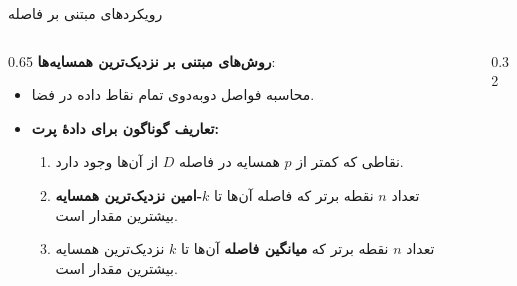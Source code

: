 \begin{frame}{رویکردهای مبتنی بر فاصله}{}
  \begin{columns}[T]
    \begin{column}{0.65\textwidth}
      \textbf{روش‌های مبتنی بر نزدیک‌ترین همسایه‌ها}: 
      \begin{itemize}
        \setlength{\itemsep}{4pt}
        \item محاسبه فواصل دوبه‌دوی تمام نقاط داده در فضا.
        \item \textbf{تعاریف گوناگون برای دادۀ پرت:}
        \begin{enumerate}
          \setlength{\itemsep}{3pt}
          \item نقاطی که کمتر از $p$ همسایه در فاصله $D$ از آن‌ها وجود دارد.
          \item تعداد $n$ نقطه برتر که فاصله آن‌ها تا \textbf{$k$-امین نزدیک‌ترین همسایه} بیشترین مقدار است.
          \item تعداد $n$ نقطه برتر که \textbf{میانگین فاصله} آن‌ها تا $k$ نزدیک‌ترین همسایه بیشترین مقدار است.
        \end{enumerate}
      \end{itemize}
    \end{column}
    \begin{column}{0.32\textwidth}
      \begin{center}
        \vspace*{0.3cm}
      \end{center}
    \end{column}
  \end{columns}
\end{frame}

